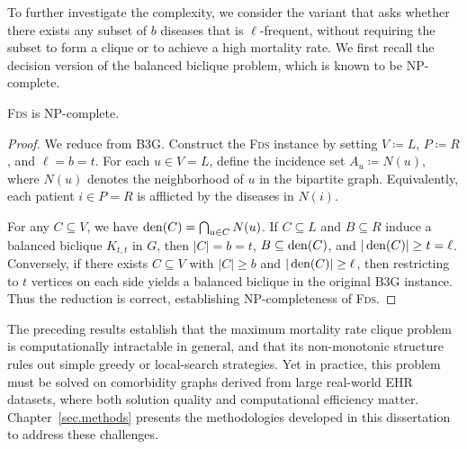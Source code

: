 To further investigate the complexity, we consider the variant that asks whether there exists any subset of $b$ diseases that is $\ell$-frequent, without requiring the subset to form a clique or to achieve a high mortality rate. We first recall the decision version of the balanced biclique problem, which is known to be NP-complete.



\begin{theorem}\label{thm.HFLS}
    \textsc{Fds} is NP-complete.
\end{theorem}
\begin{proof}
    We reduce from \textsc{B3G}. Construct the \textsc{Fds} instance by setting $V \coloneqq L$, $P \coloneqq R$, and $\ell = b = t$. For each $u \in V = L$, define the incidence set $A_u \coloneqq N(u)$, where $N(u)$ denotes the neighborhood of $u$ in the bipartite graph. Equivalently, each patient $i \in P = R$ is afflicted by the diseases in $N(i)$.

    For any $C \subseteq V$, we have $\operatorname*{den}(C) = \bigcap_{u \in C} N(u)$. If $C \subseteq L$ and $B \subseteq R$ induce a balanced biclique $K_{t,t}$ in $G$, then $|C| = b = t$, $B \subseteq \operatorname*{den}(C)$, and $|\operatorname*{den}(C)| \ge t = \ell$. Conversely, if there exists $C \subseteq V$ with $|C| \ge b$ and $|\operatorname*{den}(C)| \ge \ell$, then restricting to $t$ vertices on each side yields a balanced biclique in the original \textsc{B3G} instance. Thus the reduction is correct, establishing NP-completeness of \textsc{Fds}.
\end{proof}

The preceding results establish that the maximum mortality rate clique problem is 
computationally intractable in general, and that its non-monotonic structure rules out 
simple greedy or local-search strategies. Yet in practice, this problem must be solved on 
comorbidity graphs derived from large real-world EHR datasets, where both solution quality 
and computational efficiency matter. Chapter~\ref{sec.methods} presents the methodologies developed in this dissertation to address these challenges.